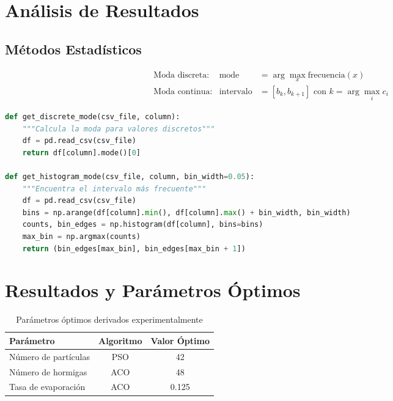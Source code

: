 \documentclass{article}
\begin{document}
\section{Análisis de Resultados}

\subsection{Métodos Estadísticos}
\begin{align*}
&\text{Moda discreta:} & \text{mode} &= \arg\max_{x} \text{frecuencia}(x) \\
&\text{Moda continua:} & \text{intervalo} &= [b_k, b_{k+1}] \text{ con } k = \arg\max_i c_i
\end{align*}

\begin{lstlisting}[language=Python, caption=Funciones de análisis estadístico]
def get_discrete_mode(csv_file, column):
    """Calcula la moda para valores discretos"""
    df = pd.read_csv(csv_file)
    return df[column].mode()[0]

def get_histogram_mode(csv_file, column, bin_width=0.05):
    """Encuentra el intervalo más frecuente"""
    df = pd.read_csv(csv_file)
    bins = np.arange(df[column].min(), df[column].max() + bin_width, bin_width)
    counts, bin_edges = np.histogram(df[column], bins=bins)
    max_bin = np.argmax(counts)
    return (bin_edges[max_bin], bin_edges[max_bin + 1])
\end{lstlisting}

\section{Resultados y Parámetros Óptimos}

\begin{table}[H]
\centering
\begin{tabular}{lcc}
\toprule
\textbf{Parámetro} & \textbf{Algoritmo} & \textbf{Valor Óptimo} \\
\midrule
Número de partículas & PSO & 42 \\
Número de hormigas & ACO & 48 \\
Tasa de evaporación & ACO & 0.125 \\
\bottomrule
\end{tabular}
\caption{Parámetros óptimos derivados experimentalmente}
\end{table}
\end{document}
